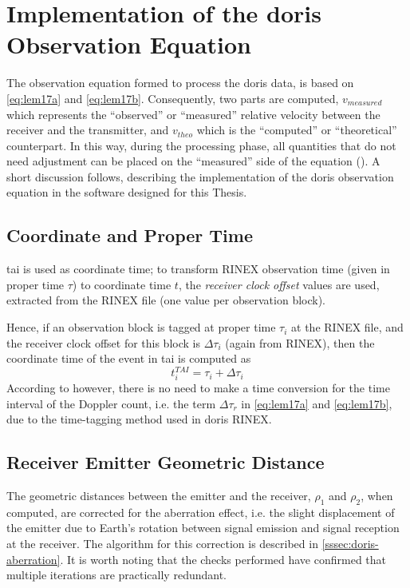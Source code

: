 \section{Implementation of the \gls{doris} Observation Equation}\label{sec:doris-observation-equation-implementation}
The observation equation formed to process the \gls{doris} data, is based on 
\autoref{eq:lem17a} and \autoref{eq:lem17b}. Consequently, two parts are computed, $v_{measured}$ which 
represents the ``observed'' or ``measured'' relative velocity between the receiver 
and the transmitter, and $v_{theo}$ which is the ``computed'' or ``theoretical'' 
counterpart. In this way, during the processing phase, all quantities that do not 
need adjustment can be placed on the ``measured'' side of the equation 
(\cite{Lemoine2016}). A short discussion follows, describing the implementation 
of the \gls{doris} observation equation in the software designed for this Thesis.

\subsection{Coordinate and Proper Time}\label{ssec:coordinate-proper-time}
\gls{tai} is used as coordinate time; to transform RINEX observation time (given in 
proper time $\tau$) to coordinate time $t$, the \emph{receiver clock offset} values 
are used, extracted from the RINEX file (one value per observation block).

Hence, if an observation block is tagged at proper time $\tau _i$ at the RINEX 
file, and the receiver clock offset for this block is $\Delta \tau _i$ (again from 
RINEX), then the coordinate time of the event in \gls{tai} is computed as
\begin{equation}
  t^{TAI}_i = \tau _i + \Delta \tau _i
\end{equation}
According to \cite{Lemoine2016} however, there is no need to make a time conversion 
for the time interval of the Doppler count, i.e. the term $\Delta \tau _r$ in 
\autoref{eq:lem17a} and \autoref{eq:lem17b}, due to the time-tagging method used in \gls{doris} RINEX.

\subsection{Receiver Emitter Geometric Distance}
The geometric distances between the emitter and the receiver, $\rho _1$ and $\rho _2$, 
when computed, are corrected for the aberration effect, i.e. the slight displacement of 
the emitter due to Earth's rotation between signal emission and signal reception at
the receiver. The algorithm for this correction is described in \autoref{sssec:doris-aberration}.
It is worth noting that the checks performed have confirmed that multiple iterations 
are practically redundant.

